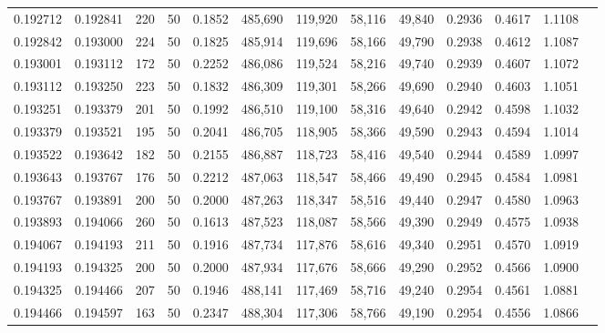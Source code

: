 \begin{tabular}{rrrrrrrrrrrrr}
0.192712 & 0.192841 &   220 &  50 &                                     0.1852 & 485,690 & 119,920 &  58,116 &  49,840 & 0.2936 & 0.4617 & 1.1108 \\
0.192842 & 0.193000 &   224 &  50 &                                     0.1825 & 485,914 & 119,696 &  58,166 &  49,790 & 0.2938 & 0.4612 & 1.1087 \\
0.193001 & 0.193112 &   172 &  50 &                                     0.2252 & 486,086 & 119,524 &  58,216 &  49,740 & 0.2939 & 0.4607 & 1.1072 \\
0.193112 & 0.193250 &   223 &  50 &                                     0.1832 & 486,309 & 119,301 &  58,266 &  49,690 & 0.2940 & 0.4603 & 1.1051 \\
0.193251 & 0.193379 &   201 &  50 &                                     0.1992 & 486,510 & 119,100 &  58,316 &  49,640 & 0.2942 & 0.4598 & 1.1032 \\
0.193379 & 0.193521 &   195 &  50 &                                     0.2041 & 486,705 & 118,905 &  58,366 &  49,590 & 0.2943 & 0.4594 & 1.1014 \\
0.193522 & 0.193642 &   182 &  50 &                                     0.2155 & 486,887 & 118,723 &  58,416 &  49,540 & 0.2944 & 0.4589 & 1.0997 \\
0.193643 & 0.193767 &   176 &  50 &                                     0.2212 & 487,063 & 118,547 &  58,466 &  49,490 & 0.2945 & 0.4584 & 1.0981 \\
0.193767 & 0.193891 &   200 &  50 &                                     0.2000 & 487,263 & 118,347 &  58,516 &  49,440 & 0.2947 & 0.4580 & 1.0963 \\
0.193893 & 0.194066 &   260 &  50 &                                     0.1613 & 487,523 & 118,087 &  58,566 &  49,390 & 0.2949 & 0.4575 & 1.0938 \\
0.194067 & 0.194193 &   211 &  50 &                                     0.1916 & 487,734 & 117,876 &  58,616 &  49,340 & 0.2951 & 0.4570 & 1.0919 \\
0.194193 & 0.194325 &   200 &  50 &                                     0.2000 & 487,934 & 117,676 &  58,666 &  49,290 & 0.2952 & 0.4566 & 1.0900 \\
0.194325 & 0.194466 &   207 &  50 &                                     0.1946 & 488,141 & 117,469 &  58,716 &  49,240 & 0.2954 & 0.4561 & 1.0881 \\
0.194466 & 0.194597 &   163 &  50 &                                     0.2347 & 488,304 & 117,306 &  58,766 &  49,190 & 0.2954 & 0.4556 & 1.0866 \\

\end{tabular}
